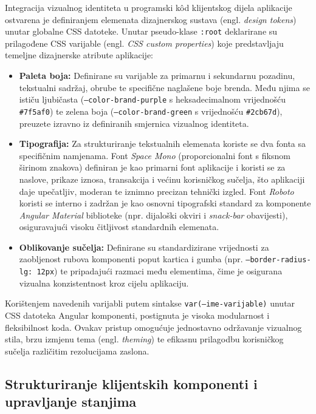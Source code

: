 \documentclass[a4paper,12pt,oneside]{article}
\begin{document}
	Integracija vizualnog identiteta u programski kôd klijentskog dijela aplikacije ostvarena je definiranjem elemenata dizajnerskog sustava (engl. \textit{design tokens}) unutar globalne CSS datoteke. Unutar pseudo-klase \texttt{:root} deklarirane su prilagođene CSS varijable (engl. \textit{CSS custom properties}) koje predstavljaju temeljne dizajnerske atribute aplikacije:
	\begin{itemize}
		\item \textbf{Paleta boja:} Definirane su varijable za primarnu i sekundarnu pozadinu, tekstualni sadržaj, obrube te specifične naglašene boje brenda. Među njima se ističu ljubičasta (\texttt{--color-brand-purple} s heksadecimalnom vrijednošću \texttt{\#7f5af0}) te zelena boja (\texttt{--color-brand-green} s vrijednošću \texttt{\#2cb67d}), preuzete izravno iz definiranih smjernica vizualnog identiteta.
		
		\item \textbf{Tipografija:} Za strukturiranje tekstualnih elemenata koriste se dva fonta sa specifičnim namjenama. Font \textit{Space Mono} (proporcionalni font s fiksnom širinom znakova) definiran je kao primarni font aplikacije i koristi se za naslove, prikaze iznosa, transakcija i većinu korisničkog sučelja, što aplikaciji daje upečatljiv, moderan te iznimno precizan tehnički izgled. Font \textit{Roboto} koristi se interno i zadržan je kao osnovni tipografski standard za komponente \textit{Angular Material} biblioteke (npr. dijaloški okviri i \textit{snack-bar} obavijesti), osiguravajući visoku čitljivost standardnih elemenata.
		
		\item \textbf{Oblikovanje sučelja:} Definirane su standardizirane vrijednosti za zaobljenost rubova komponenti poput kartica i gumba (npr. \texttt{--border-radius-lg: 12px}) te pripadajući razmaci među elementima, čime je osigurana vizualna konzistentnost kroz cijelu aplikaciju.
	\end{itemize}
	
	Korištenjem navedenih varijabli putem sintakse \texttt{var(--ime-varijable)} unutar CSS datoteka Angular komponenti, postignuta je visoka modularnost i fleksibilnost koda. Ovakav pristup omogućuje jednostavno održavanje vizualnog stila, brzu izmjenu tema (engl. \textit{theming}) te efikasnu prilagodbu korisničkog sučelja različitim rezolucijama zaslona.

	\newpage

	\subsection{Strukturiranje klijentskih komponenti i upravljanje stanjima}
	
\end{document}
